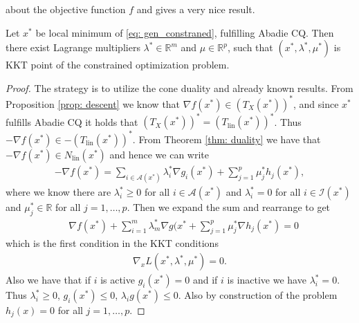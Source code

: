 about the objective function $f$ and gives a very nice result.
\begin{theorem}
    Let $x^{*}$ be local minimum of \ref{eq: gen_constraned}, fulfilling
    Abadie CQ. Then there exist Lagrange multipliers $\lambda^{*} \in
    \mathbb{R}^{m} $ and $\mu \in \mathbb{R}^{p}$, such that $(x^{*},
    \lambda^{*},\mu^{*})$ is KKT point of the constrained optimization
    problem.
\end{theorem}
\begin{proof}
   The strategy is to utilize the cone duality and already known results.
   From Proposition \ref{prop: descent} we know that $\nabla f(x^{*}) \in
   (T_X(x^{*}))^{*} $, and since $x^{*}$ fulfills Abadie CQ it holds that
   $(T_X(x^{*}))^{*}  = (T_{\text{lin}}(x^{*}))^{*}$. Thus $-\nabla f(x^{*})
   \in -(T_{\text{lin}}(x^{*}))^{*}$. From Theorem \ref{thm: duality} we have
   that $-\nabla f(x^{*}) \in N_{\text{lin} }(x^{*})$ and hence we can write
   \begin{align}
       -\nabla f(x^{*}) = \sum_{i \in \mathcal{A}(x^{*}) } \lambda_i^{*}  \nabla g_i(x^{*}) +
    \sum_{j=1}^{p} \mu_j^{*}h_j(x^{*}),
   \end{align}
   where we know there are $\lambda^{*}_i \ge 0$ for all $i \in
   \mathcal{A}(x^{*})$ and $\lambda^{*}_i = 0$ for all $i \in
   \mathcal{I}(x^{*})$ and $\mu^{*}_j \in \mathbb{R}$ for all $j=1,\ldots,p$.
   Then we expand the sum and rearrange to get
   \begin{align}
       &\nabla f(x^{*}) + \sum_{i=1}^{m} \lambda^{*}_m\nabla g(x^{*}
    + \sum_{j=1}^{p} \mu^{*}_j \nabla h_j(x^{*}) = 0
   \end{align}
   which is the first condition in the KKT conditions
   \begin{align}
       \nabla_x L(x^{*}, \lambda^{*}, \mu^{*}) = 0.
   \end{align}
   Also we have that if $i$ is active $g_i(x^{*}) = 0$ and if $i$ is inactive
   we have $\lambda_i^{*}=0$. Thus  $\lambda^{*}_i \ge 0$, $g_i(x^{*})\le 0$,  $\lambda_i
g(x^{*}) \le 0$. Also by construction of the problem $h_j(x)=0$ for all
$j=1,\ldots,p$.
\end{proof}
